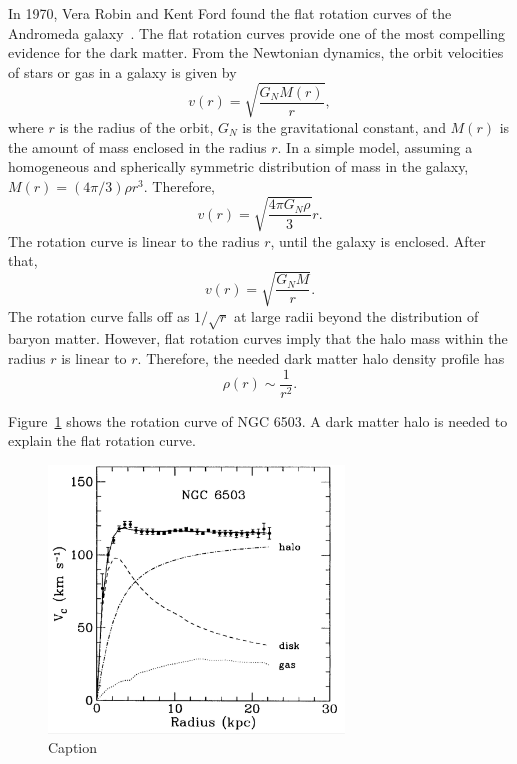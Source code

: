 \documentclass[doublespace,nopageskip]{VTthesis} %
\begin{document}
In 1970, Vera Robin and Kent Ford found the flat rotation curves of the Andromeda galaxy~\cite{1970ApJ...159..379R}. The flat rotation curves provide one of the most compelling evidence for the dark matter. From the Newtonian dynamics, the orbit velocities of stars or gas in a galaxy is given by
\begin{equation}
    v(r) = \sqrt{\frac{G_N M(r)}{r}},
\end{equation}
where $r$ is the radius of the orbit, $G_N$ is the gravitational constant, and $M(r)$ is the amount of mass enclosed in the radius $r$. In a simple model, assuming a homogeneous and spherically symmetric distribution of mass in the galaxy, $M(r) = (4\pi/3)\rho r^3$. Therefore,
\begin{equation}
    v(r) = \sqrt{\frac{4\pi G_N \rho}{3}}r.
\end{equation}
The rotation curve is linear to the radius $r$, until the galaxy is enclosed. After that,
\begin{equation}
    v(r) = \sqrt{\frac{G_N M}{r}}.
\end{equation}
The rotation curve falls off as $1/\sqrt{r}$ at large radii beyond the distribution of baryon matter. However, flat rotation curves imply that the halo mass within the radius $r$ is linear to $r$. Therefore, the needed dark matter halo density profile has
\begin{equation}
    \rho(r) \sim \frac{1}{r^2}.
\end{equation}

Figure~\ref{fig:rotation_curves} shows the rotation curve of NGC 6503. A dark matter halo is needed to explain the flat rotation curve.
\begin{figure}[htb]
    \centering
    \includegraphics[width=0.7\textwidth]{Figures/Intro/rotation_curves.eps}
    \caption{Caption~\cite{1991MNRAS.249..523B}}
    \label{fig:rotation_curves}
\end{figure}
\end{document}
